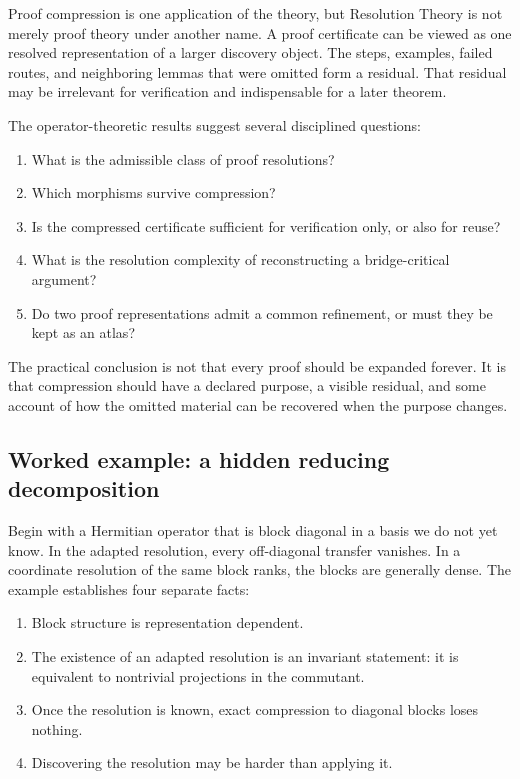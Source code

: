 \documentclass[11pt]{article}
\theoremstyle{definition}
\theoremstyle{remark}
\begin{document}
Proof compression is one application of the theory, but Resolution Theory is not merely proof theory under another name.  A proof certificate can be viewed as one resolved representation of a larger discovery object.  The steps, examples, failed routes, and neighboring lemmas that were omitted form a residual.  That residual may be irrelevant for verification and indispensable for a later theorem.

The operator-theoretic results suggest several disciplined questions:
\begin{enumerate}[label=\arabic*.]
\item What is the admissible class of proof resolutions?
\item Which morphisms survive compression?
\item Is the compressed certificate sufficient for verification only, or also for reuse?
\item What is the resolution complexity of reconstructing a bridge-critical argument?
\item Do two proof representations admit a common refinement, or must they be kept as an atlas?
\end{enumerate}

The practical conclusion is not that every proof should be expanded forever.  It is that compression should have a declared purpose, a visible residual, and some account of how the omitted material can be recovered when the purpose changes.

\subsection{Worked example: a hidden reducing decomposition}

Begin with a Hermitian operator that is block diagonal in a basis we do not yet know.  In the adapted resolution, every off-diagonal transfer vanishes.  In a coordinate resolution of the same block ranks, the blocks are generally dense.  The example establishes four separate facts:

\begin{enumerate}[label=\arabic*.]
\item Block structure is representation dependent.
\item The existence of an adapted resolution is an invariant statement: it is equivalent to nontrivial projections in the commutant.
\item Once the resolution is known, exact compression to diagonal blocks loses nothing.
\item Discovering the resolution may be harder than applying it.
\end{enumerate}
\end{document}
